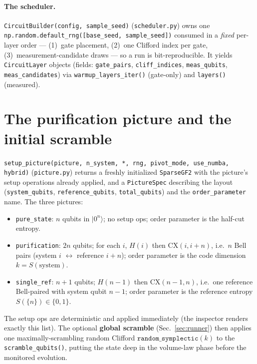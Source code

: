 \documentclass[11pt]{article}
\newcommand{\code}[1]{\texttt{#1}}
\newcommand{\file}[1]{\texttt{#1}}
\begin{document}
\paragraph{The scheduler.} \code{CircuitBuilder(config, sample\_seed)} (\file{scheduler.py}) owns one
\code{np.random.default\_rng([base\_seed, sample\_seed])} consumed in a \emph{fixed} per-layer order ---
(1)~gate placement, (2)~one Clifford index per gate, (3)~measurement-candidate draws --- so a run is
bit-reproducible. It yields \code{CircuitLayer} objects (fields: \code{gate\_pairs}, \code{cliff\_indices},
\code{meas\_qubits}, \code{meas\_candidates}) via \code{warmup\_layers\_iter()} (gate-only) and \code{layers()}
(measured).

\section{The purification picture and the initial scramble}
\label{sec:picture}
\code{setup\_picture(picture, n\_system, *, rng, pivot\_mode, use\_numba, hybrid)} (\file{picture.py}) returns a
freshly initialized \code{SparseGF2} with the picture's setup operations already applied, and a \code{PictureSpec}
describing the layout (\code{system\_qubits}, \code{reference\_qubits}, \code{total\_qubits}) and the
\code{order\_parameter} name. The three pictures:
\begin{itemize}[itemsep=2pt]
\item \code{pure\_state}: $n$ qubits in $|0^n\rangle$; no setup ops; order parameter is the half-cut entropy.
\item \code{purification}: $2n$ qubits; for each $i$, $H(i)$ then $\mathrm{CX}(i,i{+}n)$, i.e.\ $n$ Bell pairs
(system $i$ $\leftrightarrow$ reference $i{+}n$); order parameter is the code dimension $k=S(\text{system})$.
\item \code{single\_ref}: $n{+}1$ qubits; $H(n{-}1)$ then $\mathrm{CX}(n{-}1,n)$, i.e.\ one reference Bell-paired
with system qubit $n{-}1$; order parameter is the reference entropy $S(\{n\})\in\{0,1\}$.
\end{itemize}
The setup ops are deterministic and applied immediately (the inspector renders exactly this list). The optional
\textbf{global scramble} (Sec.~\ref{sec:runner}) then applies one maximally-scrambling random Clifford
$\code{random\_symplectic}(k)$ to the \code{scramble\_qubits()}, putting the state deep in the volume-law phase
before the monitored evolution.
\end{document}
